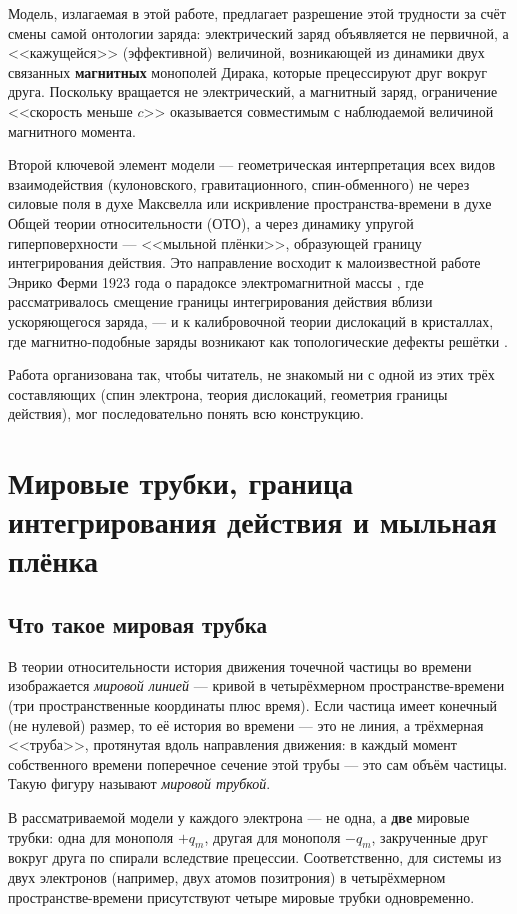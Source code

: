 \documentclass[12pt,a4paper]{article}
\begin{document}
Модель, излагаемая в этой работе, предлагает разрешение этой
трудности за счёт смены самой онтологии заряда: электрический заряд
объявляется не первичной, а <<кажущейся>> (эффективной) величиной,
возникающей из динамики двух связанных \textbf{магнитных} монополей
Дирака, которые прецессируют друг вокруг друга. Поскольку вращается
не электрический, а магнитный заряд, ограничение <<скорость меньше
$c$>> оказывается совместимым с наблюдаемой величиной магнитного
момента.

Второй ключевой элемент модели --- геометрическая интерпретация всех
видов взаимодействия (кулоновского, гравитационного, спин-обменного)
не через силовые поля в духе Максвелла или искривление
пространства-времени в духе Общей теории относительности (ОТО), а
через динамику упругой гиперповерхности --- <<мыльной плёнки>>,
образующей границу интегрирования действия. Это направление восходит
к малоизвестной работе Энрико Ферми 1923 года о парадоксе
электромагнитной массы \cite{Fermi1923}, где рассматривалось смещение
границы интегрирования действия вблизи ускоряющегося заряда, --- и к
калибровочной теории дислокаций в кристаллах, где магнитно-подобные
заряды возникают как топологические дефекты решётки
\cite{Lazar2010,KadicEdelen1983}.

Работа организована так, чтобы читатель, не знакомый ни с одной из
этих трёх составляющих (спин электрона, теория дислокаций,
геометрия границы действия), мог последовательно понять всю
конструкцию.

\section{Мировые трубки, граница интегрирования действия и мыльная плёнка}

\subsection{Что такое мировая трубка}

В теории относительности история движения точечной частицы во
времени изображается \emph{мировой линией} --- кривой в
четырёхмерном пространстве-времени (три пространственные координаты
плюс время). Если частица имеет конечный (не нулевой) размер, то её
история во времени --- это не линия, а трёхмерная <<труба>>,
протянутая вдоль направления движения: в каждый момент собственного
времени поперечное сечение этой трубы --- это сам объём частицы.
Такую фигуру называют \emph{мировой трубкой}.

В рассматриваемой модели у каждого электрона --- не одна, а
\textbf{две} мировые трубки: одна для монополя $+q_m$, другая для
монополя $-q_m$, закрученные друг вокруг друга по спирали вследствие
прецессии. Соответственно, для системы из двух электронов (например,
двух атомов позитрония) в четырёхмерном пространстве-времени
присутствуют четыре мировые трубки одновременно.
\end{document}
